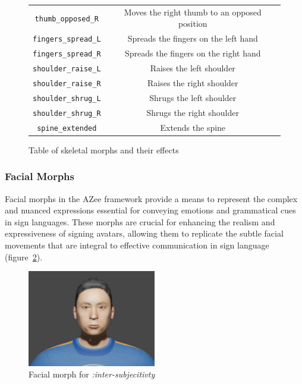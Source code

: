 \documentclass[../../main.tex]{subfiles}
\begin{document}
\begin{figure}
\begin{tabular}{|c|c|}
        \texttt{thumb\_opposed\_R} & Moves the right thumb to an opposed position \\
        \texttt{fingers\_spread\_L} & Spreads the fingers on the left hand \\
        \texttt{fingers\_spread\_R} & Spreads the fingers on the right hand \\
        \hline
        \texttt{shoulder\_raise\_L} & Raises the left shoulder \\
        \texttt{shoulder\_raise\_R} & Raises the right shoulder \\
        \texttt{shoulder\_shrug\_L} & Shrugs the left shoulder \\
        \texttt{shoulder\_shrug\_R} & Shrugs the right shoulder \\
        \texttt{spine\_extended} & Extends the spine \\
        \hline
    \end{tabular}
    \caption{Table of skeletal morphs and their effects}
    \label{fig:skeletal_morphs}
\end{figure}

\subsubsection{Facial Morphs}
\label{ch:rigging_layers:proc_rig_signing_avatars:morph_constraints:facial_morphs}

Facial morphs in the AZee framework provide a means to represent the complex and nuanced expressions essential for conveying emotions and grammatical cues in sign languages. These morphs are crucial for enhancing the realism and expressiveness of signing avatars, allowing them to replicate the subtle facial movements that are integral to effective communication in sign language (figure~\ref{fig:facial_example}).

\begin{figure}
    \centering
    \includegraphics[width=0.5\textwidth]{chapters/rigging_layers/images/facial_example.png}
    \caption{Facial morph for \emph{:inter-subjecitivty}}
    \label{fig:facial_example}
\end{figure}
\end{document}
